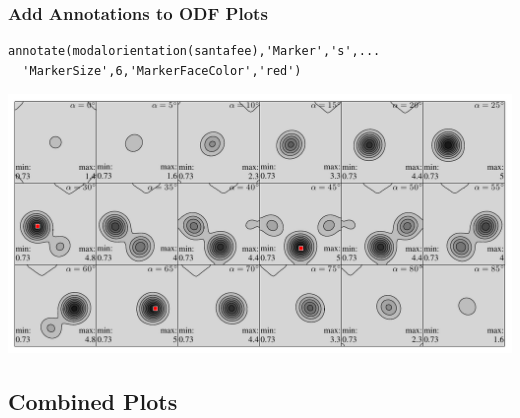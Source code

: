 \begin{frame}[fragile]
  \frametitle{Add Annotations to ODF Plots}


\begin{lstlisting}
annotate(modalorientation(santafee),'Marker','s',...
  'MarkerSize',6,'MarkerFaceColor','red')
\end{lstlisting}

\includegraphics[width=\textwidth]{pic/odfanotate}

\end{frame}

\subsection*{Combined Plots}

